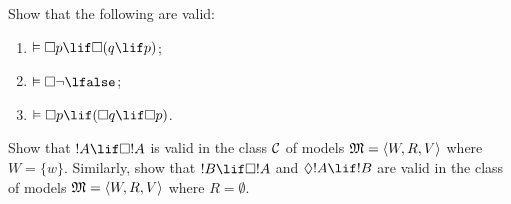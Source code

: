 \documentclass[../../../include/open-logic-section]{subfiles}
\begin{document}
\begin{prob}
  Show that the following are valid:
  \begin{enumerate}
  \item $\Entails \Box p \lif \Box (q \lif p)$;
  \item $\Entails \Box \lnot \lfalse$;
  \item $\Entails \Box p \lif (\Box q \lif \Box p)$.
  \end{enumerate}
\end{prob}

\begin{prob}
  Show that $!A \lif \Box!A$ is valid in the class $\mathcal{C}$ of
  models $\mModel{M} = \tuple{W, R, V}$ where $W = \{w\}$. Similarly,
  show that $!B \lif \Box !A$ and $\Diamond !A \lif !B$ are valid in
  the class of models $\mModel{M} = \tuple{W, R, V}$ where
  $R = \emptyset$.
\end{prob}
\end{document}
